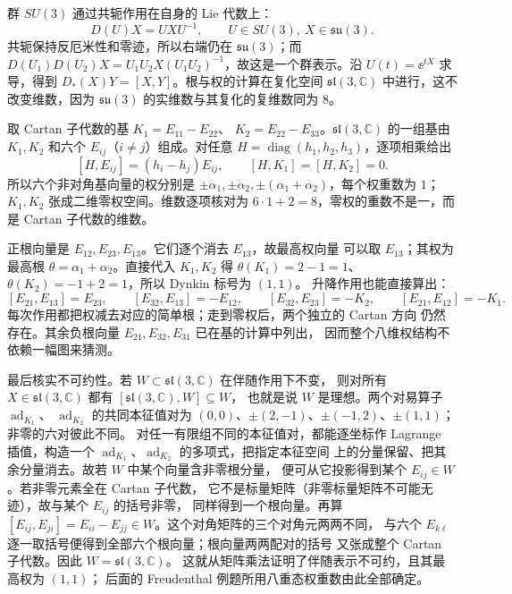 \begin{example}
群 $SU(3)$ 通过共轭作用在自身的 Lie 代数上：
\[
D(U)X=UXU^{-1},\qquad U\in SU(3),\ X\in\mathfrak{su}(3).
\]
共轭保持反厄米性和零迹，所以右端仍在 $\mathfrak{su}(3)$；而
$D(U_1)D(U_2)X=U_1U_2X(U_1U_2)^{-1}$，故这是一个群表示。沿
$U(t)=\ee^{tX}$ 求导，得到 $D_*(X)Y=[X,Y]$。根与权的计算在复化空间
$\mathfrak{sl}(3,\mathbb C)$ 中进行，这不改变维数，因为 $\mathfrak{su}(3)$
的实维数与其复化的复维数同为 $8$。

取 Cartan 子代数的基 $K_1=E_{11}-E_{22}$、
$K_2=E_{22}-E_{33}$。$\mathfrak{sl}(3,\mathbb C)$ 的一组基由
$K_1,K_2$ 和六个 $E_{ij}$（$i\ne j$）组成。对任意
$H=\operatorname{diag}(h_1,h_2,h_3)$，逐项相乘给出
\[
[H,E_{ij}]=(h_i-h_j)E_{ij},\qquad [H,K_1]=[H,K_2]=0.
\]
所以六个非对角基向量的权分别是
$\pm\alpha_1,\pm\alpha_2,\pm(\alpha_1+\alpha_2)$，每个权重数为 $1$；
$K_1,K_2$ 张成二维零权空间。维数逐项核对为
$6\cdot1+2=8$，零权的重数不是一，而是 Cartan 子代数的维数。

正根向量是 $E_{12},E_{23},E_{13}$。它们逐个消去 $E_{13}$，故最高权向量
可以取 $E_{13}$；其权为最高根
$\theta=\alpha_1+\alpha_2$。直接代入 $K_1,K_2$ 得
$\theta(K_1)=2-1=1$、$\theta(K_2)=-1+2=1$，所以 Dynkin 标号为 $(1,1)$。
升降作用也能直接算出：
\[
[E_{21},E_{13}]=E_{23},\qquad
[E_{32},E_{13}]=-E_{12},\qquad
[E_{32},E_{23}]=-K_2,\qquad
[E_{21},E_{12}]=-K_1.
\]
每次作用都把权减去对应的简单根；走到零权后，两个独立的 Cartan 方向
仍然存在。其余负根向量 $E_{21},E_{32},E_{31}$ 已在基的计算中列出，
因而整个八维权结构不依赖一幅图来猜测。

最后核实不可约性。若 $W\subset\mathfrak{sl}(3,\mathbb C)$ 在伴随作用下不变，
则对所有 $X\in\mathfrak{sl}(3,\mathbb C)$ 都有 $[\mathfrak{sl}(3,\mathbb C),W]\subseteq W$，
也就是说 $W$ 是理想。两个对易算子 $\operatorname{ad}_{K_1}$、
$\operatorname{ad}_{K_2}$ 的共同本征值对为
$(0,0)$、$\pm(2,-1)$、$\pm(-1,2)$、$\pm(1,1)$；非零的六对彼此不同。
对任一有限组不同的本征值对，都能逐坐标作 Lagrange 插值，构造一个
$\operatorname{ad}_{K_1}$、$\operatorname{ad}_{K_2}$ 的多项式，把指定本征空间
上的分量保留、把其余分量消去。故若 $W$ 中某个向量含非零根分量，
便可从它投影得到某个 $E_{ij}\in W$。若非零元素全在 Cartan 子代数，
它不是标量矩阵（非零标量矩阵不可能无迹），故与某个 $E_{ij}$ 的括号非零，
同样得到一个根向量。再算
$[E_{ij},E_{ji}]=E_{ii}-E_{jj}\in W$。这个对角矩阵的三个对角元两两不同，
与六个 $E_{k\ell}$ 逐一取括号便得到全部六个根向量；根向量两两配对的括号
又张成整个 Cartan 子代数。因此 $W=\mathfrak{sl}(3,\mathbb C)$。
这就从矩阵乘法证明了伴随表示不可约，且其最高权为 $(1,1)$；
后面的 Freudenthal 例题所用八重态权重数由此全部确定。
\end{example}

